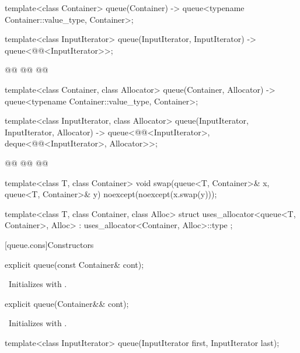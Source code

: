 \documentclass{wg21}
\begin{document}
\begin{codeblock}
{    template<class Container>
    queue(Container) -> queue<typename Container::value_type, Container>;

    template<class InputIterator>
    queue(InputIterator, InputIterator) -> queue<@@<InputIterator>>;


    @@
    @@
    @@

    template<class Container, class Allocator>
    queue(Container, Allocator) -> queue<typename Container::value_type, Container>;

    template<class InputIterator, class Allocator>
    queue(InputIterator, InputIterator, Allocator)
    -> queue<@@<InputIterator>, deque<@@<InputIterator>, Allocator>>;

    @@
    @@
    @@

    template<class T, class Container>
    void swap(queue<T, Container>& x, queue<T, Container>& y) noexcept(noexcept(x.swap(y)));

    template<class T, class Container, class Alloc>
    struct uses_allocator<queue<T, Container>, Alloc>
    : uses_allocator<Container, Alloc>::type { };
}
\end{codeblock}

[queue.cons]{Constructors}

\begin{itemdecl}
    explicit queue(const Container& cont);
\end{itemdecl}

\begin{itemdescr}
    \pnum
    \effects\ Initializes  with .
\end{itemdescr}

\begin{itemdecl}
    explicit queue(Container&& cont);
\end{itemdecl}

\begin{itemdescr}
    \pnum
    \effects\ Initializes  with .
\end{itemdescr}

\begin{itemdecl}
    template<class InputIterator>
    queue(InputIterator first, InputIterator last);
\end{itemdecl}
\end{document}
